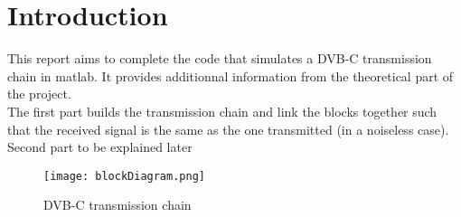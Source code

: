 \setcounter{secnumdepth}{-1}

\chapter{Introduction}

This report aims to complete the code that simulates a DVB-C transmission chain in matlab. It provides additionnal information from the theoretical part of the project. \\
The first part builds the transmission chain and link the blocks together such that the received signal is the same as the one transmitted (in a noiseless case). \\

\Large{Second part to be explained later}
\normalsize

\vspace{2cm}

\begin{figure}[H]
    \centering
    \texttt{[image: blockDiagram.png]}
    \caption{DVB-C transmission chain}
    \label{fig:blockDiagram}
\end{figure}
